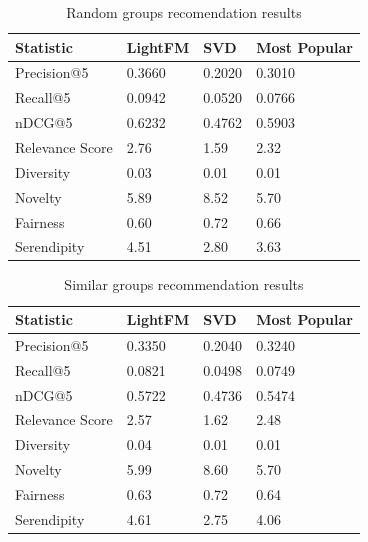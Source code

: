 \documentclass{article}
\begin{document}
\begin{table}[]
    \centering
    \begin{tabular}{|l|l|l|l|}
        \hline
        \textbf{Statistic} & \textbf{LightFM} & \textbf{SVD} & \textbf{Most Popular} \\ \hline
        Precision@5        & 0.3660           & 0.2020       & 0.3010                \\
        Recall@5           & 0.0942           & 0.0520       & 0.0766                \\
        nDCG@5             & 0.6232           & 0.4762       & 0.5903                \\
        Relevance Score    & 2.76             & 1.59         & 2.32                  \\
        Diversity          & 0.03             & 0.01         & 0.01                  \\
        Novelty            & 5.89             & 8.52         & 5.70                  \\
        Fairness           & 0.60             & 0.72         & 0.66                  \\
        Serendipity        & 4.51             & 2.80         & 3.63                  \\ \hline
    \end{tabular}
    \caption{Random groups recomendation results}
    \label{tab:resultados-modelos}
\end{table}

\begin{table}[]
    \centering
    \begin{tabular}{|l|l|l|l|}
        \hline
        \textbf{Statistic} & \textbf{LightFM} & \textbf{SVD} & \textbf{Most Popular} \\ \hline
        Precision@5        & 0.3350           & 0.2040       & 0.3240                \\
        Recall@5           & 0.0821           & 0.0498       & 0.0749                \\
        nDCG@5             & 0.5722           & 0.4736       & 0.5474                \\
        Relevance Score    & 2.57             & 1.62         & 2.48                  \\
        Diversity          & 0.04             & 0.01         & 0.01                  \\
        Novelty            & 5.99             & 8.60         & 5.70                  \\
        Fairness           & 0.63             & 0.72         & 0.64                  \\
        Serendipity        & 4.61             & 2.75         & 4.06                  \\ \hline
    \end{tabular}
    \caption{Similar groups recommendation results}
    \label{tab:resultados-modelos-similar}
\end{table}
\end{document}
